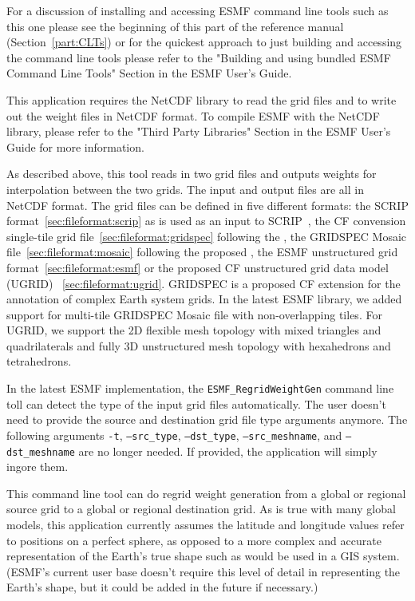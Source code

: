 For a discussion of installing and accessing ESMF command line tools such as this one please see the beginning of this part of the reference manual (Section~\ref{part:CLTs}) or for the quickest approach to just building and accessing the command line tools please refer to the "Building and using bundled ESMF Command Line Tools" Section in the ESMF User's Guide.

This application requires the NetCDF library to read the grid files and to write out the weight files in NetCDF format.  To compile ESMF with the NetCDF library, please refer to the "Third Party Libraries" Section in the ESMF User's Guide for more information.

As described above, this tool reads in
two grid files and outputs weights for interpolation
 between the two grids. The input and output files are all in NetCDF format. The grid files can be defined in five
different formats:  the SCRIP format~\ref{sec:fileformat:scrip} as is used as an input to SCRIP~\cite{ref:SCRIP}, the CF convension single-tile grid file~\ref{sec:fileformat:gridspec} following the
, the GRIDSPEC Mosaic file~\ref{sec:fileformat:mosaic} following the proposed ,  
the ESMF unstructured grid format~\ref{sec:fileformat:esmf} or the proposed CF unstructured grid data model (UGRID) ~\ref{sec:fileformat:ugrid}.  GRIDSPEC is a proposed CF extension for the annotation of complex Earth system grids.  In the latest ESMF library, we added support for multi-tile GRIDSPEC Mosaic file with non-overlapping tiles. For UGRID, we support the 2D flexible mesh topology with mixed triangles and quadrilaterals and fully 3D unstructured mesh topology with hexahedrons and tetrahedrons.  

In the latest ESMF implementation, the {\tt ESMF\_RegridWeightGen} command line toll can detect the type of the input grid files automatically.  The user
doesn't need to provide the source and destination grid file type arguments anymore.  The following arguments {\tt -t}, {\tt --src\_type}, {\tt --dst\_type}, {\tt --src\_meshname}, and {\tt --dst\_meshname} are no longer needed.  If provided, the application will simply ingore them.

This command line tool can do regrid weight generation from a global or regional source grid to a global or regional destination grid.
As is true with many global models, this application currently assumes the latitude and longitude values refer to positions on a perfect sphere, as opposed to a more complex and accurate representation of the Earth's true shape such as would be used in a GIS system. (ESMF's current user base doesn't require this level of detail in representing the Earth's shape, but it could be added in the future if necessary.)

